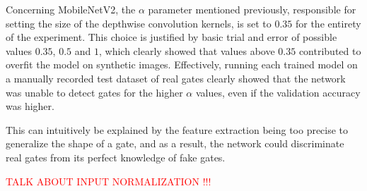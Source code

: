 Concerning MobileNetV2, the $\alpha$ parameter mentioned previously, responsible
for setting the size of the depthwise convolution kernels, is set to $0.35$ for
the entirety of the experiment. This choice is justified by basic trial and
error of possible values $0.35$, $0.5$ and $1$, which clearly showed that
values above $0.35$ contributed to overfit the model on synthetic images.
Effectively, running each trained model on a manually recorded test dataset of
real gates clearly showed that the network was unable to detect gates for the
higher $\alpha$ values, even if the validation accuracy was higher.

This can intuitively be explained by the feature extraction being too precise
to generalize the shape of a gate, and as a result, the network could
discriminate real gates from its perfect knowledge of fake gates.

\textcolor{red}{TALK ABOUT INPUT NORMALIZATION !!!}
